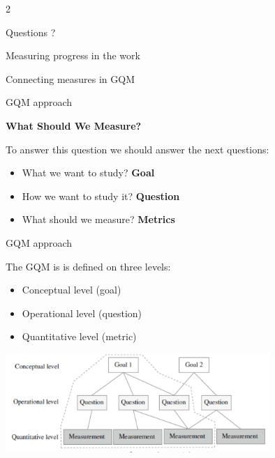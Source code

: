 \documentclass{beamer}
\begin{document}
\begin{frame}{\centerline{}}
2

\begin{center}
{\Large
Questions ?
}
\end{center}


\end{frame}

\begin{frame}{\centerline{Measuring progress in the work}}

\begin{center}
{\Large
Connecting measures in GQM
}
\end{center}
\end{frame}

\begin{frame}{\centerline{GQM approach}}


\textbf{What Should We Measure?}
\newline 

To answer this question we should answer the next questions:

\begin{itemize}
\item  What we want to study?   \textbf{Goal}
\item  How we want to study it? \textbf{Question}
\item   What should we measure? \textbf{Metrics}
\end{itemize}







\end{frame}

\begin{frame}{\centerline{GQM approach}}


The GQM is is defined on three levels:
\begin{itemize}

\item  Conceptual level (goal)
\item  Operational level (question)
\item  Quantitative level (metric)

\end{itemize}

\begin{center}
\includegraphics[width=100mm]{A2022.IDSEPC.SperimentazioneDeduzione/image-02.png}
\end{center}
\end{frame}
\end{document}
